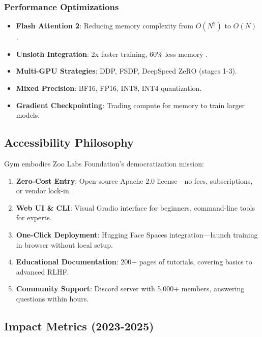 \documentclass[twocolumn,11pt]{article}
\begin{document}
\subsubsection{Performance Optimizations}
\begin{itemize}
    \item \textbf{Flash Attention 2}: Reducing memory complexity from $O(N^2)$ to $O(N)$ \citep{dao2023flashattention2}.
    \item \textbf{Unsloth Integration}: 2x faster training, 60\% less memory \citep{unsloth2024}.
    \item \textbf{Multi-GPU Strategies}: DDP, FSDP, DeepSpeed ZeRO (stages 1-3).
    \item \textbf{Mixed Precision}: BF16, FP16, INT8, INT4 quantization.
    \item \textbf{Gradient Checkpointing}: Trading compute for memory to train larger models.
\end{itemize}

\subsection{Accessibility Philosophy}

Gym embodies Zoo Labs Foundation's democratization mission:

\begin{enumerate}
    \item \textbf{Zero-Cost Entry}: Open-source Apache 2.0 license—no fees, subscriptions, or vendor lock-in.
    \item \textbf{Web UI \& CLI}: Visual Gradio interface for beginners, command-line tools for experts.
    \item \textbf{One-Click Deployment}: Hugging Face Spaces integration—launch training in browser without local setup.
    \item \textbf{Educational Documentation}: 200+ pages of tutorials, covering basics to advanced RLHF.
    \item \textbf{Community Support}: Discord server with 5,000+ members, answering questions within hours.
\end{enumerate}

\subsection{Impact Metrics (2023-2025)}
\end{document}
